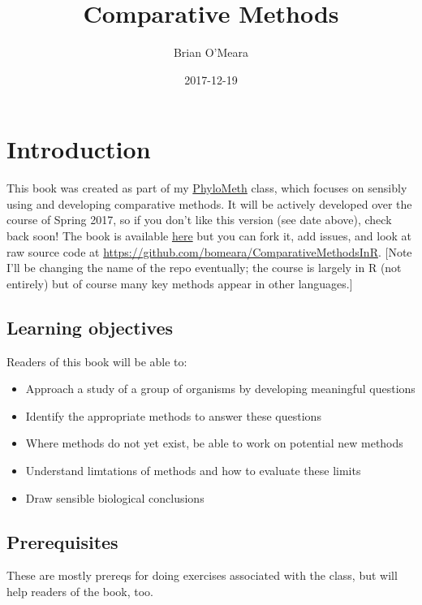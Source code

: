 \documentclass[]{article}
\title{Comparative Methods}
\author{Brian O'Meara}
\date{2017-12-19}
\providecommand{\tightlist}{%
  \setlength{\itemsep}{0pt}\setlength{\parskip}{0pt}}
\theoremstyle{definition}
\theoremstyle{definition}
\theoremstyle{definition}
\theoremstyle{remark}
\begin{document}
\maketitle

{
\setcounter{tocdepth}{2}
\tableofcontents
}
\hypertarget{introduction}{%
\section{Introduction}\label{introduction}}

This book was created as part of my
\href{http://www.phylometh.org}{PhyloMeth} class, which focuses on
sensibly using and developing comparative methods. It will be actively
developed over the course of Spring 2017, so if you don't like this
version (see date above), check back soon! The book is available
\href{https://bookdown.org/bomeara/comparative-methods/}{here} but you
can fork it, add issues, and look at raw source code at
\url{https://github.com/bomeara/ComparativeMethodsInR}. {[}Note I'll be
changing the name of the repo eventually; the course is largely in R
(not entirely) but of course many key methods appear in other
languages.{]}

\hypertarget{learning-objectives}{%
\subsection{Learning objectives}\label{learning-objectives}}

Readers of this book will be able to:

\begin{itemize}
\tightlist
\item
  Approach a study of a group of organisms by developing meaningful
  questions
\item
  Identify the appropriate methods to answer these questions
\item
  Where methods do not yet exist, be able to work on potential new
  methods
\item
  Understand limtations of methods and how to evaluate these limits
\item
  Draw sensible biological conclusions
\end{itemize}

\hypertarget{prerequisites}{%
\subsection{Prerequisites}\label{prerequisites}}

These are mostly prereqs for doing exercises associated with the class,
but will help readers of the book, too.
\end{document}
